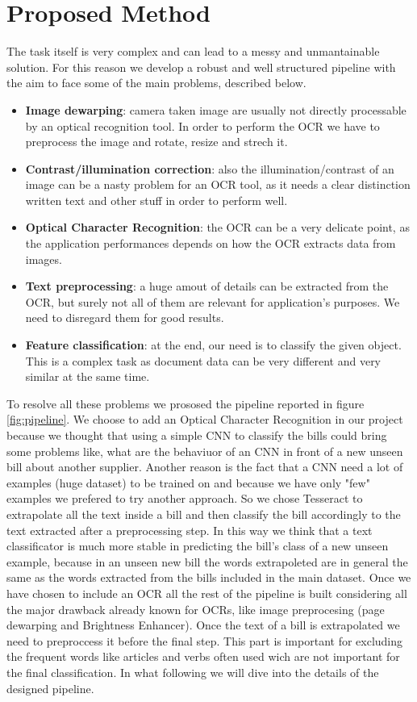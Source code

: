 \documentclass[10pt,twocolumn,letterpaper]{article}
\begin{document}
\section{Proposed Method}
\label{sec:proposed-method}

The task itself is very complex and can lead to a messy and
unmantainable solution. For this reason we develop a robust and well
structured pipeline with the aim to face some of the main problems,
described below.

\begin{itemize}
  \item \textbf{Image dewarping}: camera taken image are usually not directly
    processable by an optical recognition tool. In order to perform
    the OCR we have to preprocess the image and rotate, resize and
    strech it.
  	\item \textbf{Contrast/illumination correction}: also the illumination/contrast of an image can be a nasty problem for an OCR tool, as it needs a clear distinction written text and other stuff in order to perform well.
  \item \textbf{Optical Character Recognition}: the OCR can be a very delicate
    point, as the application performances depends on how the OCR
    extracts data from images.
  \item \textbf{Text preprocessing}: a huge amout of details can be extracted
    from the OCR, but surely not all of them are relevant for
    application's purposes. We need to disregard them for good results.
  \item \textbf{Feature classification}: at the end, our need is to classify
    the given object. This is a complex task as document data can be
    very different and very similar at the same time.
\end{itemize}

To resolve all these problems we prososed the pipeline reported in
figure \ref{fig:pipeline}. We choose to add an Optical Character
Recognition in our project because we thought that using a simple CNN
to classify the bills could bring some problems like, what are the
behaviuor of an CNN in front of a new unseen bill about another
supplier. Another reason is the fact that a CNN need a lot of examples
(huge dataset) to be trained on and because we have only "few" examples we
prefered to try another approach. So we chose Tesseract to extrapolate
all the text inside a bill and then classify the bill accordingly to the text extracted after a preprocessing step. In this way we think that a text classificator
is much more stable in predicting the bill's class of a new unseen
example, because in an unseen new bill the words extrapoleted are in
general the same as the words extracted from the bills included in the
main dataset. Once we have chosen to include an OCR all the rest of
the pipeline is built considering all the major drawback already known for OCRs, like image preprocesing (page dewarping and Brightness Enhancer). Once the text of a bill is extrapolated we need to preproccess it before the final step. This part is important for excluding the frequent words like articles and verbs often used wich are not important for the final classification. In
what following we will dive into the details of the designed pipeline.
\end{document}
